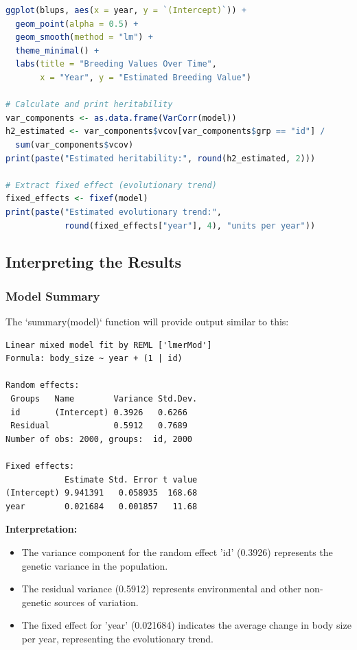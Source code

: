 \documentclass[12pt,a4paper]{article}
\begin{document}
\begin{lstlisting}[language=R]
ggplot(blups, aes(x = year, y = `(Intercept)`)) +
  geom_point(alpha = 0.5) +
  geom_smooth(method = "lm") +
  theme_minimal() +
  labs(title = "Breeding Values Over Time", 
       x = "Year", y = "Estimated Breeding Value")

# Calculate and print heritability
var_components <- as.data.frame(VarCorr(model))
h2_estimated <- var_components$vcov[var_components$grp == "id"] / 
  sum(var_components$vcov)
print(paste("Estimated heritability:", round(h2_estimated, 2)))

# Extract fixed effect (evolutionary trend)
fixed_effects <- fixef(model)
print(paste("Estimated evolutionary trend:", 
            round(fixed_effects["year"], 4), "units per year"))
\end{lstlisting}

\subsection{Interpreting the Results}

\subsubsection{Model Summary}

The `summary(model)` function will provide output similar to this:

\begin{verbatim}
Linear mixed model fit by REML ['lmerMod']
Formula: body_size ~ year + (1 | id)

Random effects:
 Groups   Name        Variance Std.Dev.
 id       (Intercept) 0.3926   0.6266  
 Residual             0.5912   0.7689  
Number of obs: 2000, groups:  id, 2000

Fixed effects:
            Estimate Std. Error t value
(Intercept) 9.941391   0.058935  168.68
year        0.021684   0.001857   11.68
\end{verbatim}

\textbf{Interpretation:}
\begin{itemize}
    \item The variance component for the random effect 'id' (0.3926) represents the genetic variance in the population.
    \item The residual variance (0.5912) represents environmental and other non-genetic sources of variation.
    \item The fixed effect for 'year' (0.021684) indicates the average change in body size per year, representing the evolutionary trend.
\end{itemize}
\end{document}
